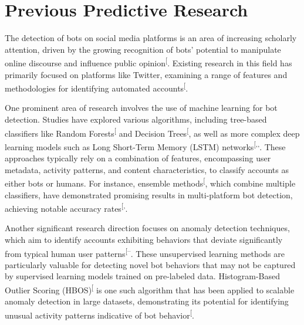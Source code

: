 \documentclass[
  12pt,
  letterpaper,
  DIV=11,
  numbers=noendperiod,
  abstract]{scrartcl}
\begin{document}
\section{Previous Predictive
Research}\label{previous-predictive-research}

The detection of bots on social media platforms is an area of increasing
scholarly attention, driven by the growing recognition of bots'
potential to manipulate online discourse and influence public
opinion\textsuperscript{{[}\citeproc{ref-multibotdetector}{4}{]}}.
Existing research in this field has primarily focused on platforms like
Twitter, examining a range of features and methodologies for identifying
automated
accounts\textsuperscript{{[}\citeproc{ref-redditbotwatch}{3}{]}}.

One prominent area of research involves the use of machine learning for
bot detection. Studies have explored various algorithms, including
tree-based classifiers like Random
Forests\textsuperscript{{[}\citeproc{ref-breiman2001random}{5}{]}} and
Decision
Trees\textsuperscript{{[}\citeproc{ref-breiman1984classification}{6}{]}},
as well as more complex deep learning models such as Long Short-Term
Memory (LSTM)
networks\textsuperscript{{[},,\citeproc{ref-hochreiter1997long}{8}{]}}.
These approaches typically rely on a combination of features,
encompassing user metadata, activity patterns, and content
characteristics, to classify accounts as either bots or humans. For
instance, ensemble
methods\textsuperscript{{[}\citeproc{ref-dietterich2000ensemble}{9}{]}},
which combine multiple classifiers, have demonstrated promising results
in multi-platform bot detection, achieving notable accuracy
rates\textsuperscript{{[},\citeproc{ref-multibotdetector}{4}{]}}.

Another significant research direction focuses on anomaly detection
techniques, which aim to identify accounts exhibiting behaviors that
deviate significantly from typical human user
patterns\textsuperscript{{[}--\citeproc{ref-chandola2009anomaly}{12}{]}}.
These unsupervised learning methods are particularly valuable for
detecting novel bot behaviors that may not be captured by supervised
learning models trained on pre-labeled data. Histogram-Based Outlier
Scoring
(HBOS)\textsuperscript{{[}\citeproc{ref-goldstein2012histogram}{13}{]}}
is one such algorithm that has been applied to scalable anomaly
detection in large datasets, demonstrating its potential for identifying
unusual activity patterns indicative of bot
behavior\textsuperscript{{[}\citeproc{ref-anomalycloudflare}{10}{]}}.
\end{document}
